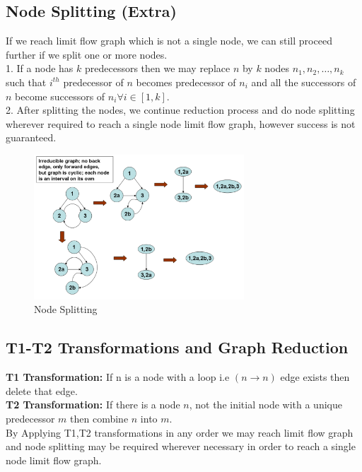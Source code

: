\documentclass{article}
\begin{document}
\subsection*{Node Splitting (Extra)}
If we reach limit flow graph which is not a single node, we can still proceed further if we split one or more nodes. \\ 
1. If a node has $k$ predecessors then we may replace $n$ by $k$ nodes $n_1, n_2, \ldots, n_k$ such that $i^{th}$ predecessor of $n$ becomes predecessor of $n_i$ and all the successors of $n$ become successors of $n_i \forall i \in [1,k]$. \\
2. After splitting the nodes, we continue reduction process and do node splitting wherever required to reach a single node limit flow graph, however success is not guaranteed. \\

\begin{figure}
    \centering
    \includegraphics[width=0.7\textwidth]{Images/nodeSplit.png}
    \caption{Node Splitting}
    \label{fig:NodeSplitting}
\end{figure}

\subsection*{T1-T2 Transformations and Graph Reduction}
\textbf{T1 Transformation: }If n is a node with a loop i.e $(n \rightarrow n)$ edge exists then delete that edge. \\
\textbf{T2 Transformation: }If there is a node $n$, not the initial node with a unique predecessor $m$ then combine $n$ into $m$. \\

By Applying T1,T2 transformations in any order we may reach limit flow graph and node splitting may be required wherever necessary in order to reach a single node limit flow graph.
\end{document}
